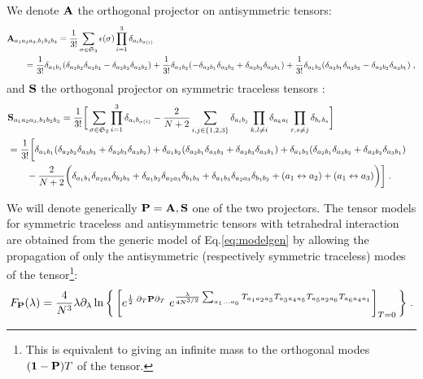 \documentclass[10pt]{article}
\theoremstyle{plain}
\theoremstyle{definition}
\newcommand{\bP}{ {\bf P} }
\newcommand{\bA}{ {\bf A} }
\newcommand{\bS}{ {\bf S} }
\begin{document}
We denote $\bA$ the orthogonal projector on antisymmetric tensors:
\begin{align}\label{eq:A}
& \bA_{a_1a_2a_3, b_1b_2b_3} = \frac{1}{3!} \sum_{\sigma\in \mathfrak{S}_3} \epsilon(\sigma) \prod_{i=1}^3 \delta_{a_i b_{ \sigma(i)} }  \\
& \qquad =   \frac{1}{3!} \delta_{a_1b_1} ( \delta_{a_2b_2} \delta_{a_3 b_3} - \delta_{a_2b_3} \delta_{a_3b_2}  ) + 
        \frac{1}{3!}  \delta_{a_1b_2} ( - \delta_{a_2b_1} \delta_{a_3 b_3} +\delta_{a_2b_3} \delta_{a_3b_1}  )  +
      \frac{1}{3!} \delta_{a_1b_3} (\delta_{a_2 b_1} \delta_{a_3 b_2} -  \delta_{a_2 b_2} \delta_{a_3 b_1} )  \;, \nonumber
\end{align}
and $\bS$ the orthogonal projector on symmetric traceless tensors \cite{Klebanov:2017nlk}:
\begin{align}\label{eq:S}
& \bS_{a_1a_2a_3, b_1b_2b_3} = \frac{1}{3!} \bigg[ \sum_{\sigma\in \mathfrak{S}_3}  \prod_{i=1}^3 \delta_{a_i b_{ \sigma(i)} }  -\frac{2}{N+2}  
   \sum_{i,j \in \{1,2,3\} } \delta_{a_ib_j}  \prod_{k,l \neq i } \delta_{a_k a_l} \prod_{r,s\neq j} \delta_{b_rb_s}
\bigg]\crcr
& =  \frac{1}{3!} \bigg[ 
  \delta_{a_1b_1} ( \delta_{a_2b_2} \delta_{a_3 b_3} + \delta_{a_2b_3} \delta_{a_3b_2}  ) + 
         \delta_{a_1b_2} (  \delta_{a_2b_1} \delta_{a_3 b_3} +\delta_{a_2b_3} \delta_{a_3b_1}  )  +
      \delta_{a_1b_3} (\delta_{a_2 b_1} \delta_{a_3 b_2} +  \delta_{a_2 b_2} \delta_{a_3 b_1} )  \crcr
 & \qquad -\frac{2}{N + 2} \bigg( 
   \delta_{a_1b_1} \delta_{a_2a_3} \delta_{b_2b_3} + \delta_{a_1b_2} \delta_{a_2a_3} \delta_{b_1b_3} + \delta_{a_1b_3} \delta_{a_2a_3} \delta_{b_1b_2} + (a_1 \leftrightarrow  a_2) + (a_1 \leftrightarrow  a_3)
 \bigg)
 \bigg] \;. 
\end{align}

We will denote generically $\bP = \bA, \bS $ one of the two projectors.
The tensor models for symmetric traceless and antisymmetric tensors with tetrahedral interaction are obtained from the generic model of  Eq.\eqref{eq:modelgen} by allowing the propagation
of only the antisymmetric (respectively symmetric traceless) modes of the tensor\footnote{This is equivalent to giving an infinite mass to the orthogonal modes $({\bf 1} - \bP)T$ of the tensor.}:
\begin{align}\label{eq:crucial}
  F_{\bP}(\lambda) = \frac{4}{N^3} \lambda\partial_{\lambda} \ln \bigg\{
     \left[ e^{\frac{1}{2} \;   \partial_T \bP \partial_T   }      \; e^{  \frac{  \lambda  }{4 N^{3/2}}   
 \sum_{a_1\dots a_6}  T_{a_1a_2a_3}   T_{a_3a_4a_5}    T_{a_5 a_2 a_6}  T_{a_6a_4 a_1} } \right]_{T=0}
  \bigg\} \;.
\end{align}
\end{document}
